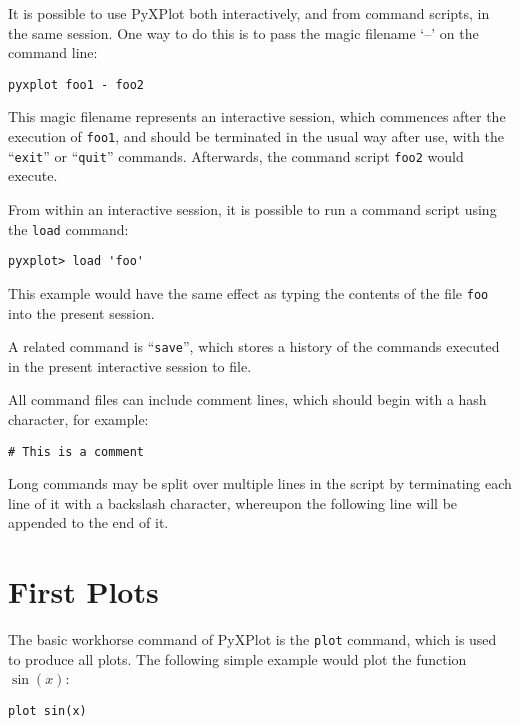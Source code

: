 \documentclass[a4paper,onecolumn,11pt]{book}
\begin{document}
It is possible to use PyXPlot both interactively, and from command scripts, in
the same session. One way to do this is to pass the magic filename `--' on the
command line:

\begin{verbatim}
pyxplot foo1 - foo2
\end{verbatim}

\noindent This magic filename represents an interactive session, which
commences after the execution of \texttt{foo1}, and should be terminated in the
usual way after use, with the ``\texttt{exit}'' or ``\texttt{quit}'' commands.
Afterwards, the command script \texttt{foo2} would execute.

From within an interactive session, it is possible to run a command script
using the \texttt{load} command:

\begin{verbatim}
pyxplot> load 'foo'
\end{verbatim}

\noindent This example would have the same effect as typing the contents of the
file \texttt{foo} into the present session.

A related command is ``\texttt{save}'', which stores a history of the commands executed in the present
interactive session to file.

All command files can include comment lines, which should begin with a hash
character, for example:

\begin{verbatim}
# This is a comment
\end{verbatim}

Long commands may be split over multiple lines in the script by terminating
each line of it with a backslash character, whereupon the following line will
be appended to the end of it.

\section{First Plots}
\label{first_plots}

The basic workhorse command of PyXPlot is the \texttt{plot} command, which is
used to produce all plots. The following simple example would plot the function
$\sin(x)$:

\begin{verbatim}
plot sin(x)
\end{verbatim}
\end{document}
